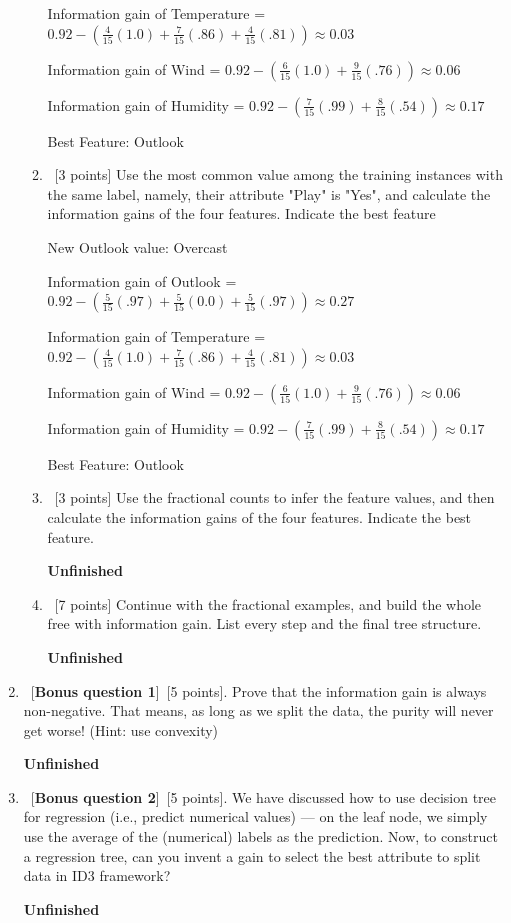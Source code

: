 \documentclass[12pt, fullpage,letterpaper]{article}
\begin{document}
\begin{enumerate}
\begin{enumerate}
\begin{framed}
	Information gain of Temperature = $0.92 - (\frac{4}{15}(1.0) + \frac{7}{15}(.86) + \frac{4}{15}(.81)) \approx 0.03$
	
	Information gain of Wind = $0.92 - (\frac{6}{15}(1.0) + \frac{9}{15}(.76)) \approx 0.06 $
	
	Information gain of Humidity = $0.92 - (\frac{7}{15}(.99) + \frac{8}{15}(.54)) \approx 0.17 $
	
	Best Feature: Outlook
\end{framed}
\item~[3 points] Use the most common value among the  training instances with the same label, namely, their attribute "Play" is "Yes", and calculate the information gains of the four features. Indicate the best feature
\begin{framed}
	  \newline
	New Outlook value: Overcast
	
	Information gain of Outlook = $0.92 - (\frac{5}{15}(.97) + \frac{5}{15}(0.0) + \frac{5}{15}(.97)) \approx 0.27 $
	
	Information gain of Temperature = $0.92 - (\frac{4}{15}(1.0) + \frac{7}{15}(.86) + \frac{4}{15}(.81)) \approx 0.03$
	
	Information gain of Wind = $0.92 - (\frac{6}{15}(1.0) + \frac{9}{15}(.76)) \approx 0.06 $
	
	Information gain of Humidity = $0.92 - (\frac{7}{15}(.99) + \frac{8}{15}(.54)) \approx 0.17 $
	
	Best Feature: Outlook
\end{framed}
\item~[3 points] Use the fractional counts to infer the feature values, and then calculate the information gains of the four features. Indicate the best feature.

\textbf{Unfinished}

\item~[7 points] Continue with the fractional examples, and build the whole free with information gain. List every step and the final tree structure.  

\textbf{Unfinished}

\end{enumerate}
\item ~[\textbf{Bonus question 1}]~[5 points].  Prove that the information gain is always non-negative.  That means, as long as we split the data, the purity will never get worse! (Hint: use convexity)

\textbf{Unfinished}

\item ~[\textbf{Bonus question 2}]~[5 points].  We have discussed how to use decision tree for regression (i.e., predict numerical values) --- on the leaf node, we simply use the average of the (numerical) labels as the prediction.  Now, to construct a regression tree, can you invent a gain to select the best attribute to split data in ID3 framework?

\textbf{Unfinished}

\end{enumerate}
\end{document}
